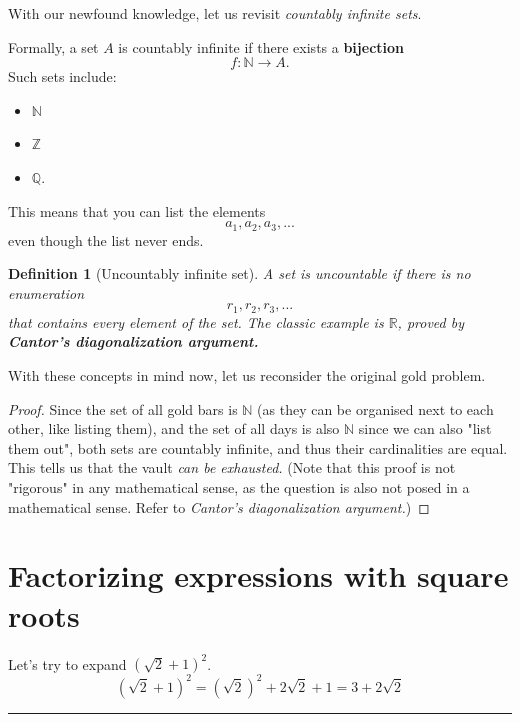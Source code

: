 \documentclass{article}
\newtheorem{definition}{Definition}
\begin{document}
With our newfound knowledge, let us revisit \emph{countably infinite sets}.

    Formally, a set $A$ is countably infinite if there exists a \textbf{bijection}
    \[
    f: \mathbb{N} \rightarrow A.
    \]
    Such sets include:
    \begin{itemize}
        \item $\mathbb{N}$
        \item $\mathbb{Z}$
        \item $\mathbb{Q}$.
    \end{itemize}
    This means that you can list the elements
    \[
    a_1, a_2, a_3,...
    \]
    even though the list never ends.

\begin{definition}[Uncountably infinite set]
    A set is uncountable if there is no enumeration
    \[
    r_1, r_2, r_3,...
    \]
    that contains every element of the set. 
    The classic example is $\mathbb{R}$, proved by \textbf{Cantor's diagonalization argument.}
\end{definition}

With these concepts in mind now, let us reconsider the original gold problem.

\begin{proof}
Since the set of all gold bars is $\mathbb{N}$ (as they can be organised next to each other, like listing them), and the set of all days is also $\mathbb{N}$ since we can also "list them out", both sets are countably infinite, and thus their cardinalities are equal. This tells us that the vault \emph{can be exhausted.} (Note that this proof is not "rigorous" in any mathematical sense, as the question is also not posed in a mathematical sense. Refer to \emph{Cantor's diagonalization argument.})
\end{proof}

\section{Factorizing expressions with square roots}
Let's try to expand $(\sqrt{2} + 1)^2$.
\[
    (\sqrt{2}+1)^2 = (\sqrt{2})^2 + 2\sqrt{2} + 1 = 3 + 2\sqrt{2}
\]

\hrule
\vspace{10pt}
\end{document}
